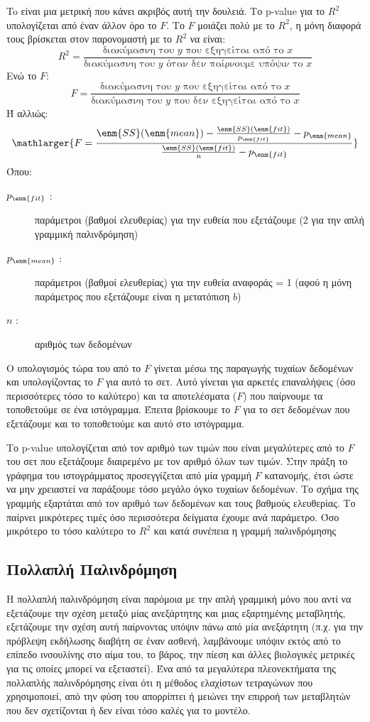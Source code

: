 To  είναι μια μετρική που κάνει ακριβός αυτή την δουλειά. Το \textlatin{p-value} για το $R^2$
υπολογίζεται από έναν άλλον όρο το $F$. Το $F$ μοιάζει πολύ με το $R^2$, η μόνη διαφορά τους
βρίσκεται στον παρονομαστή με το $R^2$
να είναι:
$$R^2=\frac{\text{διακύμασνη του }y\text{ που εξηγείται από το }x}{\text{διακύμασνη του }y\text{ όταν δεν παίρνουμε υπόψιν το }x}$$
Ενώ το $F$:
$$F=\frac{\text{διακύμασνη του }y\text{ που εξηγείται από το }x}{\text{διακύμασνη του }y\text{ που δεν εξηγείται από το }x}$$
Ή αλλιώς:
$$\mathlarger{F =\frac{\enm{SS}(\enm{mean}) - \frac{\enm{SS}(\enm{fit})}{p_{\enm{fit}}} - p_{\enm{mean}}} {\frac{\enm{SS}(\enm{fit})}{n} - p_{\enm{fit}}}}$$
Όπου:
\begin{description}
    \item[$p_{\enm{fit}}$ :] παράμετροι (βαθμοί ελευθερίας) για την ευθεία που εξετάζουμε (2 για την απλή γραμμική παλινδρόμηση)
    \item[$p_{\enm{mean}}$ :]  παράμετροι (βαθμοί ελευθερίας) για την ευθεία αναφοράς = 1 (αφού η μόνη παράμετρος που εξετάζουμε είναι η μετατόπιση $b$)
    \item[$n$ :] αριθμός των δεδομένων
\end{description}

Ο υπολογισμός τώρα του  από το $F$ γίνεται μέσω της παραγωγής τυχαίων δεδομένων
και υπολογίζοντας το $F$ για αυτό το σετ. Αυτό γίνεται για αρκετές επαναλήψεις (όσο
περισσότερες τόσο το καλύτερο) και τα αποτελέσματα ($F$) που παίρνουμε τα τοποθετούμε σε
ένα ιστόγραμμα. Έπειτα βρίσκουμε το $F$ για το σετ δεδομένων που εξετάζουμε και το
τοποθετούμε και αυτό στο ιστόγραμμα.

Το p-value υπολογίζεται από τον αριθμό των τιμών
που είναι μεγαλύτερες από το $F$ του σετ που εξετάζουμε διαιρεμένο με τον αριθμό όλων των
τιμών. Στην πράξη το γράφημα του ιστογράμματος προσεγγίζεται από μία γραμμή $F$
κατανομής, έτσι ώστε να μην χρειαστεί να παράξουμε τόσο μεγάλο όγκο τυχαίων δεδομένων.
Το σχήμα της γραμμής εξαρτάται από τον αριθμό των δεδομένων και τους βαθμούς
ελευθερίας. Το  παίρνει μικρότερες τιμές όσο περισσότερα δείγματα έχουμε ανά
παράμετρο. Όσο μικρότερο το  τόσο καλύτερο το $R^2$
και κατά συνέπεια η γραμμή
παλινδρόμησης
\subsection{Πολλαπλή Παλινδρόμηση}
Η πολλαπλή παλινδρόμηση είναι παρόμοια με την απλή γραμμική μόνο που αντί να
εξετάζουμε την σχέση μεταξύ μίας ανεξάρτητης και μιας εξαρτημένης μεταβλητής,
εξετάζουμε την σχέση αυτή παίρνοντας υπόψιν πάνω από μία ανεξάρτητη (π.χ. για την
πρόβλεψη εκδήλωσης διαβήτη σε έναν ασθενή, λαμβάνουμε υπόψιν εκτός από το επίπεδο
ινσουλίνης στο αίμα του, το βάρος, την πίεση και άλλες βιολογικές μετρικές για τις οποίες
μπορεί να εξεταστεί). Ένα από τα μεγαλύτερα πλεονεκτήματα της πολλαπλής παλινδρόμησης
είναι ότι η μέθοδος ελαχίστων τετραγώνων που χρησιμοποιεί, από την φύση του απορρίπτει
ή μειώνει την επιρροή των μεταβλητών που δεν σχετίζονται ή δεν είναι τόσο καλές για το
μοντέλο.

